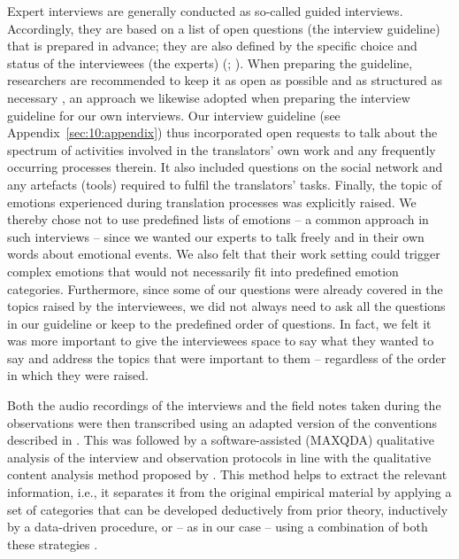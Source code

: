 \documentclass[output=paper]{langscibook}
\begin{document}
Expert interviews are generally conducted as so-called guided interviews. Accordingly, they are based on a list of open questions (the interview guideline) that is prepared in advance; they are also defined by the specific choice and status of the interviewees (the experts) (\citealp[111]{Gläser2009}; \citealp[559]{Helfferich2014}). When preparing the guideline, researchers are recommended to keep it as open as possible and as structured as necessary \citep[566]{Helfferich2014}, an approach we likewise adopted when preparing the interview guideline for our own interviews. Our interview guideline (see Appendix~\ref{sec:10:appendix}) thus incorporated open requests to talk about the spectrum of activities involved in the translators' own work and any frequently occurring processes therein. It also included questions on the social network and any artefacts (tools) required to fulfil the translators' tasks. Finally, the topic of emotions experienced during translation processes was explicitly raised. We thereby chose not to use predefined lists of emotions -- a common approach in such interviews \citep[712]{Scherer2005} -- since we wanted our experts to talk freely and in their own words about emotional events. We also felt that their work setting could trigger complex emotions that would not necessarily fit into predefined emotion categories. Furthermore, since some of our questions were already covered in the topics raised by the interviewees, we did not always need to ask all the questions in our guideline or keep to the predefined order of questions. In fact, we felt it was more important to give the interviewees space to say what they wanted to say and address the topics that were important to them -- regardless of the order in which they were raised.

Both the audio recordings of the interviews and the field notes taken during the observations were then transcribed using an adapted version of the conventions described in \citet{Selting2011}. This was followed by a software-assisted (MAXQDA) qualitative analysis of the interview and observation protocols in line with the qualitative content analysis method proposed by \citet{Gläser2009}. This method helps to extract the relevant information, i.e., it separates it from the original empirical material by applying a set of categories that can be developed deductively from prior theory, inductively by a data-driven procedure, or -- as in our case -- using a combination of both these strategies \citep[21f]{Gläser2013}.
\end{document}
